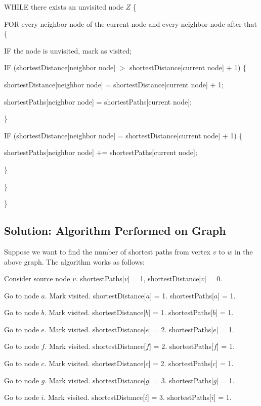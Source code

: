 \documentclass[letter,11pt]{article}
\begin{document}
\indent WHILE there exists an unvisited node $Z$ \{

\indent \indent FOR every neighbor node of the current node and every neighbor node after that \{

\indent \indent \indent IF the node is unvisited, mark as visited;

\indent \indent \indent IF (shortestDistance[neighbor node] $>$ shortestDistance[current node] + 1) \{

\indent \indent \indent \indent shortestDistance[neighbor node] = shortestDistance[current node] + 1;

\indent \indent \indent \indent shortestPaths[neighbor node] = shortestPaths[current node];

\indent \indent \indent \}

\indent \indent \indent IF (shortestDistance[neighbor node] = shortestDistance[current node] + 1) \{

\indent \indent \indent \indent shortestPaths[neighbor node] += shortestPaths[current node];

\indent \indent \indent \}

\indent \indent \}

\indent \}

\subsection{Solution: Algorithm Performed on Graph}

Suppose we want to find the number of shortest paths from vertex $v$ to $w$ in the above graph. The algorithm works as follows:

Consider source node $v$. shortestPaths[$v$] = 1, shortestDistance[$v$] = 0.

Go to node $a$. Mark visited. shortestDistance[$a$] = 1. shortestPaths[$a$] = 1.

Go to node $b$. Mark visited. shortestDistance[$b$] = 1. shortestPaths[$b$] = 1.

Go to node $e$. Mark visited. shortestDistance[$e$] = 2. shortestPaths[$e$] = 1.

Go to node $f$. Mark visited. shortestDistance[$f$] = 2. shortestPaths[$f$] = 1.

Go to node $c$. Mark visited. shortestDistance[$c$] = 2. shortestPaths[$c$] = 1.

Go to node $g$. Mark visited. shortestDistance[$g$] = 3. shortestPaths[$g$] = 1.

Go to node $i$. Mark visited. shortestDistance[$i$] = 3. shortestPaths[$i$] = 1.
\end{document}

